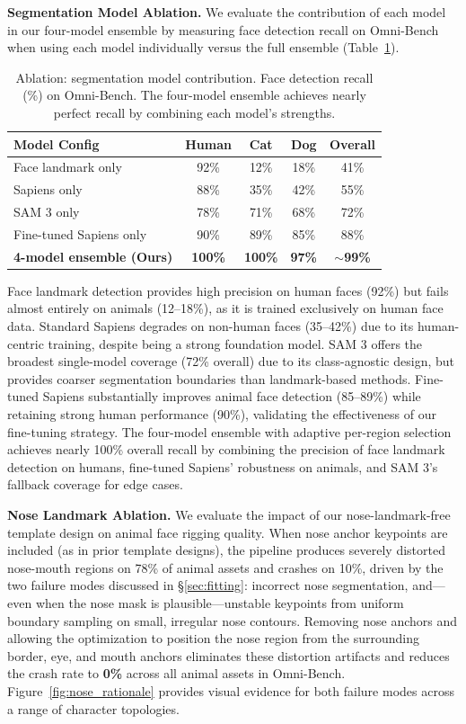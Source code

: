 \documentclass[acmtog,anonymous,review]{acmart}
\begin{document}
\textbf{Segmentation Model Ablation.} We evaluate the contribution of each model in our four-model ensemble by measuring face detection recall on Omni-Bench when using each model individually versus the full ensemble (Table~\ref{tab:seg_ablation}).

\begin{table}[t]
  \caption{Ablation: segmentation model contribution. Face detection recall (\%) on Omni-Bench. The four-model ensemble achieves nearly perfect recall by combining each model's strengths.}
  \label{tab:seg_ablation}
  \begin{tabular}{lcccc}
    \toprule
    Model Config & Human & Cat & Dog & Overall \\
    \midrule
    Face landmark only & 92\% & 12\% & 18\% & 41\% \\
    Sapiens only & 88\% & 35\% & 42\% & 55\% \\
    SAM 3 only & 78\% & 71\% & 68\% & 72\% \\
    Fine-tuned Sapiens only & 90\% & 89\% & 85\% & 88\% \\
    \textbf{4-model ensemble (Ours)} & \textbf{100\%} & \textbf{100\%} & \textbf{97\%} & \textbf{$\sim$99\%} \\
    \bottomrule
  \end{tabular}
\end{table}

Face landmark detection provides high precision on human faces (92\%) but fails almost entirely on animals (12--18\%), as it is trained exclusively on human face data. Standard Sapiens degrades on non-human faces (35--42\%) due to its human-centric training, despite being a strong foundation model. SAM 3 offers the broadest single-model coverage (72\% overall) due to its class-agnostic design, but provides coarser segmentation boundaries than landmark-based methods. Fine-tuned Sapiens substantially improves animal face detection (85--89\%) while retaining strong human performance (90\%), validating the effectiveness of our fine-tuning strategy. The four-model ensemble with adaptive per-region selection achieves nearly 100\% overall recall by combining the precision of face landmark detection on humans, fine-tuned Sapiens' robustness on animals, and SAM 3's fallback coverage for edge cases.

\textbf{Nose Landmark Ablation.} We evaluate the impact of our nose-landmark-free template design on animal face rigging quality. When nose anchor keypoints are included (as in prior template designs), the pipeline produces severely distorted nose-mouth regions on 78\% of animal assets and crashes on 10\%, driven by the two failure modes discussed in \S\ref{sec:fitting}: incorrect nose segmentation, and---even when the nose mask is plausible---unstable keypoints from uniform boundary sampling on small, irregular nose contours. Removing nose anchors and allowing the optimization to position the nose region from the surrounding border, eye, and mouth anchors eliminates these distortion artifacts and reduces the crash rate to \textbf{0\%} across all animal assets in Omni-Bench. Figure~\ref{fig:nose_rationale} provides visual evidence for both failure modes across a range of character topologies.
\end{document}
